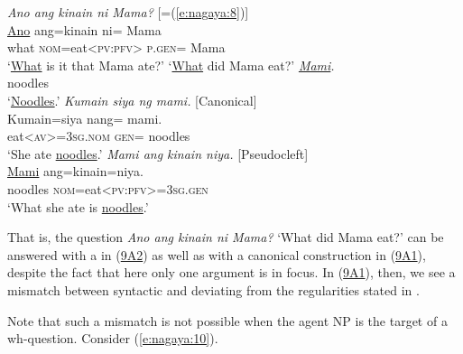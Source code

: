 \documentclass[output=paper]{langsci/langscibook}
\begin{document}
\begin{exe}
\ex\label{e:nagaya:9}
	\begin{xlist}
	  \textit{Ano ang kinain ni Mama?} [=(\ref{e:nagaya:8})]\\
	\gll \uline{Ano}  ang={\ob}k{\USSmaller}in{\USGreater}ain  ni=    Mama{\cb}{\USQMark}  \\
	what  \textsc{nom}=eat<\textsc{pv:pfv}>  \textsc{p.gen}=  Mama\\
	\glt ‘\uline{What} is it that Mama ate?’
	\glt ‘\uline{What} did Mama eat?’
	 \label{e9a0}
	\gll \textit{\uline{Mami}.}\\
	noodles\\
	\glt ‘\uline{Noodles}.’
	 \textit{Kumain siya ng mami.} {[Canonical]} \label{e9a1}\\
	\gll K{\USSmaller}um{\USGreater}ain=siya nang=  mami. \\
	eat<\textsc{av}>=3\textsc{sg.nom}  \textsc{gen}=  noodles\\
	\glt ‘She ate  \uline{noodles}.’
	 \textit{Mami ang kinain niya.} {[Pseudocleft]} \label{e9a2}\\
	\gll \uline{Mami} ang=k{\USSmaller}in{\USGreater}ain=niya. \\
	noodles  \textsc{nom}=eat<\textsc{pv:pfv}>=3\textsc{sg.gen}\\
	\glt ‘What she ate is \uline{noodles}.’
\end{xlist}
\end{exe}

\noindent
That is, the question \textit{Ano ang kinain ni Mama?} ‘What did Mama eat?’ can be answered with a  in (\hyperref[e9a2]{9A2}) as well as with a canonical construction in (\hyperref[e9a1]{9A1}), despite the fact that here only one argument is in focus. In (\hyperref[e9a1]{9A1}), then, we see a mismatch between syntactic and  deviating from the regularities stated in .

Note that such a mismatch is not possible when the agent NP is the target of a wh-question. Consider (\ref{e:nagaya:10}).
\end{document}
